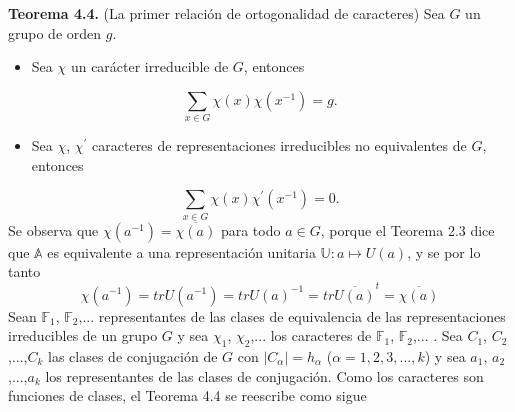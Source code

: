 \documentclass[12pt]{book}
\theoremstyle{definition}
\newcounter{in}
\begin{document}
\textbf{Teorema 4.4. } (La primer relación de ortogonalidad de
caracteres) Sea $G$ un grupo de orden $g$.
\begin{itemize}
\item Sea $\chi$ un carácter irreducible de $G$, entonces 
\end{itemize}
\begin{equation*}
\sum_{x \in G} \chi(x) \chi(x^{-1}) = g.
\end{equation*}
\begin{itemize}
\item Sea $\chi$, $\chi^{'}$ caracteres de representaciones
  irreducibles no equivalentes de $G$, entonces
\end{itemize}
\begin{equation*}
\sum_{x \in G} \chi(x) \chi^{'}(x^{-1}) = 0.
\end{equation*}
Se observa que $\chi(a^{-1})=\overline{\chi(a)}$ para todo $a \in G$,
porque el Teorema 2.3 dice que $\mathbb{A}$ es equivalente a una
representación unitaria $\mathbb{U}\colon a \mapsto U(a)$, y se por lo
tanto
\begin{equation*} \label{4.5}
\chi(a^{-1})=trU(a^{-1})=trU(a)^{-1}=tr \overline{U(a)}^{t} = \overline{\chi(a)}  
\end{equation*} 
Sean $\mathbb{F}_{1}$, $\mathbb{F}_{2}$,... representantes de las
clases de equivalencia de las representaciones irreducibles de un
grupo $G$ y sea $\chi_{1}$, $\chi_{2}$,... los caracteres de
$\mathbb{F}_{1}$, $\mathbb{F}_{2}$,... .  Sea $C_{1}$,
$C_{2}$,...,$C_{k}$ las clases de conjugación de $G$ con
$|C_{\alpha}|=h_{\alpha}$ ($\alpha=1, 2, 3,...,k$) y sea $a_{1}$,
$a_{2}$,...,$a_{k}$ los representantes de las clases de
conjugación. Como los caracteres son funciones de clases, el Teorema
4.4 se reescribe como sigue
\end{document}
